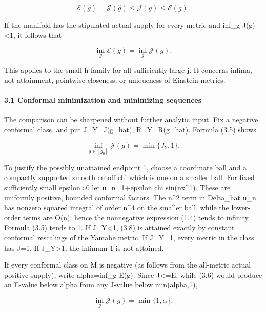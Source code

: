 \documentclass[
  10pt,
]{article}
\begin{document}
\[
 \mathcal E(\widehat g)=\mathcal J(\widehat g)
                 \le\mathcal J(g)\le\mathcal E(g).      \tag{3.6}
\]

If the manifold has the stipulated actual supply for every metric and
inf\_g J(g)\textless1, it follows that

\[
                    \inf_g\mathcal E(g)=\inf_g\mathcal J(g).
                                                               \tag{3.7}
\]

This applies to the small-h family for all sufficiently large j. It
concerns infima, not attainment, pointwise closeness, or uniqueness of
Einstein metrics.

\hypertarget{conformal-minimization-and-minimizing-sequences}{%
\paragraph{3.1 Conformal minimization and minimizing
sequences}\label{conformal-minimization-and-minimizing-sequences}}

The comparison can be sharpened without further analytic input. Fix a
negative conformal class, and put J\_Y=J(g\_hat), R\_Y=R(g\_hat).
Formula (3.5) shows

\[
             \inf_{g\in[g_0]}\mathcal J(g)=\min\{J_Y,1\}.
                                                               \tag{3.8}
\]

To justify the possibly unattained endpoint 1, choose a coordinate ball
and a compactly supported smooth cutoff chi which is one on a smaller
ball. For fixed sufficiently small epsilon\textgreater0 let
u\_n=1+epsilon chi sin(nx\^{}1). These are uniformly positive, bounded
conformal factors. The n\^{}2 term in Delta\_hat u\_n has nonzero
squared integral of order n\^{}4 on the smaller ball, while the
lower-order terms are O(n); hence the nonnegative expression (1.4) tends
to infinity. Formula (3.5) tends to 1. If J\_Y\textless1, (3.8) is
attained exactly by constant conformal rescalings of the Yamabe metric.
If J\_Y=1, every metric in the class has J=1. If J\_Y\textgreater1, the
infimum 1 is not attained.

If every conformal class on M is negative (as follows from the
all-metric actual positive supply), write alpha=inf\_g E(g). Since
J\textless=E, while (3.6) would produce an E-value below alpha from any
J-value below min(alpha,1),

\[
                 \boxed{\inf_g\mathcal J(g)=\min\{1,\alpha\}.}
                                                               \tag{3.9}
\]
\end{document}
